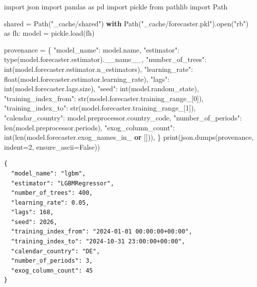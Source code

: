 \documentclass[
  english,
  letterpaper,
]{scrbook}
\newenvironment{Shaded}{\begin{snugshade}}{\end{snugshade}}
\newcommand{\BuiltInTok}[1]{\textcolor[rgb]{0.00,0.23,0.31}{#1}}
\newcommand{\ControlFlowTok}[1]{\textcolor[rgb]{0.00,0.23,0.31}{\textbf{#1}}}
\newcommand{\DecValTok}[1]{\textcolor[rgb]{0.68,0.00,0.00}{#1}}
\newcommand{\ImportTok}[1]{\textcolor[rgb]{0.00,0.46,0.62}{#1}}
\newcommand{\KeywordTok}[1]{\textcolor[rgb]{0.00,0.23,0.31}{\textbf{#1}}}
\newcommand{\NormalTok}[1]{\textcolor[rgb]{0.00,0.23,0.31}{#1}}
\newcommand{\OperatorTok}[1]{\textcolor[rgb]{0.37,0.37,0.37}{#1}}
\newcommand{\StringTok}[1]{\textcolor[rgb]{0.13,0.47,0.30}{#1}}
\newcommand{\VariableTok}[1]{\textcolor[rgb]{0.07,0.07,0.07}{#1}}
\begin{document}
\protect{}\label{load-and-introspect}
\begin{Shaded}
\begin{Highlighting}[]
\ImportTok{import}\NormalTok{ json}
\ImportTok{import}\NormalTok{ pandas }\ImportTok{as}\NormalTok{ pd}
\ImportTok{import}\NormalTok{ pickle}
\ImportTok{from}\NormalTok{ pathlib }\ImportTok{import}\NormalTok{ Path}

\NormalTok{shared }\OperatorTok{=}\NormalTok{ Path(}\StringTok{"\_cache/shared"}\NormalTok{)}
\ControlFlowTok{with}\NormalTok{ Path(}\StringTok{"\_cache/forecaster.pkl"}\NormalTok{).}\BuiltInTok{open}\NormalTok{(}\StringTok{"rb"}\NormalTok{) }\ImportTok{as}\NormalTok{ fh:}
\NormalTok{    model }\OperatorTok{=}\NormalTok{ pickle.load(fh)}

\NormalTok{provenance }\OperatorTok{=}\NormalTok{ \{}
    \StringTok{"model\_name"}\NormalTok{:            model.name,}
    \StringTok{"estimator"}\NormalTok{:             }\BuiltInTok{type}\NormalTok{(model.forecaster.estimator).}\VariableTok{\_\_name\_\_}\NormalTok{,}
    \StringTok{"number\_of\_trees"}\NormalTok{:       }\BuiltInTok{int}\NormalTok{(model.forecaster.estimator.n\_estimators),}
    \StringTok{"learning\_rate"}\NormalTok{:         }\BuiltInTok{float}\NormalTok{(model.forecaster.estimator.learning\_rate),}
    \StringTok{"lags"}\NormalTok{:                  }\BuiltInTok{int}\NormalTok{(model.forecaster.lags.size),}
    \StringTok{"seed"}\NormalTok{:                  }\BuiltInTok{int}\NormalTok{(model.random\_state),}
    \StringTok{"training\_index\_from"}\NormalTok{:   }\BuiltInTok{str}\NormalTok{(model.forecaster.training\_range\_[}\DecValTok{0}\NormalTok{]),}
    \StringTok{"training\_index\_to"}\NormalTok{:     }\BuiltInTok{str}\NormalTok{(model.forecaster.training\_range\_[}\DecValTok{1}\NormalTok{]),}
    \StringTok{"calendar\_country"}\NormalTok{:      model.preprocessor.country\_code,}
    \StringTok{"number\_of\_periods"}\NormalTok{:     }\BuiltInTok{len}\NormalTok{(model.preprocessor.periods),}
    \StringTok{"exog\_column\_count"}\NormalTok{:     }\BuiltInTok{int}\NormalTok{(}\BuiltInTok{len}\NormalTok{(model.forecaster.exog\_names\_in\_ }\KeywordTok{or}\NormalTok{ [])),}
\NormalTok{\}}
\BuiltInTok{print}\NormalTok{(json.dumps(provenance, indent}\OperatorTok{=}\DecValTok{2}\NormalTok{, ensure\_ascii}\OperatorTok{=}\VariableTok{False}\NormalTok{))}
\end{Highlighting}
\end{Shaded}

\begin{verbatim}
{
  "model_name": "lgbm",
  "estimator": "LGBMRegressor",
  "number_of_trees": 400,
  "learning_rate": 0.05,
  "lags": 168,
  "seed": 2026,
  "training_index_from": "2024-01-01 00:00:00+00:00",
  "training_index_to": "2024-10-31 23:00:00+00:00",
  "calendar_country": "DE",
  "number_of_periods": 3,
  "exog_column_count": 45
}
\end{verbatim}
\end{document}
